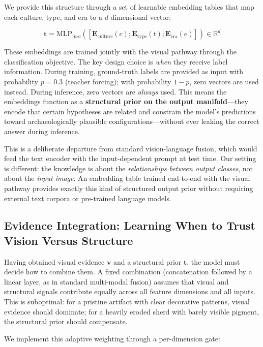 \documentclass[10pt,twocolumn,letterpaper]{article}
\begin{document}
We provide this structure through a set of learnable embedding tables that map each culture, type, and era to a $d$-dimensional vector:

\begin{equation}
\mathbf{t} = \text{MLP}_{\text{fuse}}([\mathbf{E}_{\text{culture}}(c); \mathbf{E}_{\text{type}}(t); \mathbf{E}_{\text{era}}(e)]) \in \mathbb{R}^{d}
\label{eq:text}
\end{equation}

These embeddings are trained jointly with the visual pathway through the classification objective. The key design choice is \emph{when} they receive label information. During training, ground-truth labels are provided as input with probability $p = 0.3$ (teacher forcing); with probability $1-p$, zero vectors are used instead. During inference, zero vectors are \emph{always} used. This means the embeddings function as a \textbf{structural prior on the output manifold}---they encode that certain hypotheses are related and constrain the model's predictions toward archaeologically plausible configurations---without ever leaking the correct answer during inference.

This is a deliberate departure from standard vision-language fusion, which would feed the text encoder with the input-dependent prompt at test time. Our setting is different: the knowledge is about the \emph{relationships between output classes}, not about the \emph{input image}. An embedding table trained end-to-end with the visual pathway provides exactly this kind of structured output prior without requiring external text corpora or pre-trained language models.

\subsection{Evidence Integration: Learning When to Trust Vision Versus Structure}

Having obtained visual evidence $\mathbf{v}$ and a structural prior $\mathbf{t}$, the model must decide how to combine them. A fixed combination (concatenation followed by a linear layer, as in standard multi-modal fusion) assumes that visual and structural signals contribute equally across all feature dimensions and all inputs. This is suboptimal: for a pristine artifact with clear decorative patterns, visual evidence should dominate; for a heavily eroded sherd with barely visible pigment, the structural prior should compensate.

We implement this adaptive weighting through a per-dimension gate:
\end{document}
